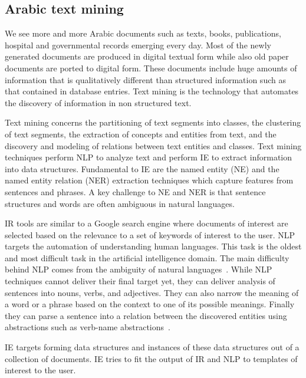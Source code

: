 \documentclass[12pt]{article}
\begin{document}
\subsection{Arabic text mining}
\label{s:design:atm}

We see more and more Arabic documents such as texts,
books, publications, hospital and governmental records emerging 
every day.
Most of the newly generated documents are produced in digital 
textual form while also old paper documents are ported to digital 
form.
These documents include huge amounts of information that is 
qualitatively different than structured information such as that 
contained in database entries.
Text mining is the technology that automates the discovery of 
information in non structured text.

Text mining concerns the partitioning of text segments 
into classes,
the clustering of text segments,
the extraction of concepts and entities from text,
and the discovery and modeling of relations between text entities 
and classes.
Text mining techniques perform NLP to analyze text and perform 
IE to extract information into data structures.
Fundamental to IE are the named entity (NE) and the named entity 
relation (NER) extraction techniques which capture features from 
sentences and phrases.
A key challenge to NE and NER is that sentence structures and 
words are often ambiguous in natural languages.

IR tools are similar to a Google search 
engine where documents of interest are selected based on the 
relevance to a set of keywords of interest to the user.
NLP targets the automation of understanding human languages.
This task is the oldest and most difficult task in the artificial 
intelligence domain.
The main difficulty behind NLP comes from the ambiguity of 
natural languages~\cite{Osm08}.
While NLP techniques cannot deliver their final target yet, they 
can deliver analysis of sentences into nouns, verbs, 
and adjectives.
They can also narrow the meaning of a word or a phrase based on 
the context to one of its possible meanings.
Finally they can parse a sentence into a relation between the 
discovered entities using abstractions such as verb-name 
abstractions~\cite{Osm08}.

IE targets forming data structures and instances of these 
data structures out of a collection of documents.
IE tries to fit the output of IR and NLP to templates of 
interest to the user.
\end{document}
